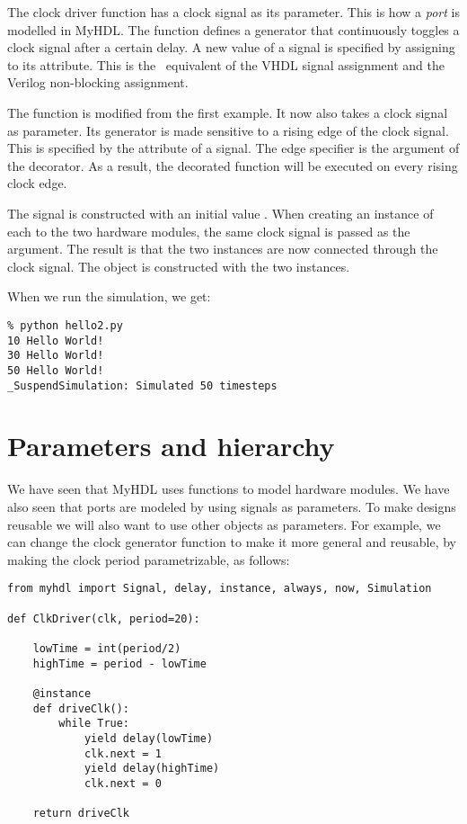 The clock driver function  has a
clock signal as its parameter. This is how a
\emph{port} is modelled in MyHDL. The function
defines a generator
that continuously toggles a clock signal after a certain delay.
A new value of a signal is specified by assigning to its
 attribute. This is the \myhdl\ equivalent of 
the VHDL signal assignment and the 
Verilog non-blocking assignment.

The  function is modified from the
first example. It now also takes a clock signal as parameter.
Its generator is made sensitive to a rising
edge of the clock signal. This is specified by the
 attribute of a signal. The edge
specifier is the argument of the 
decorator. As a result, the decorated function
will be executed on every rising clock edge.

The  signal is constructed with an initial value
. When creating an instance of each to the two
hardware modules, the same clock signal is passed as
the argument. The result is that the two instances
are now connected through the clock signal.
The  object is constructed with the
two instances.

When we run the simulation, we get:

\begin{verbatim}
% python hello2.py
10 Hello World!
30 Hello World!
50 Hello World!
_SuspendSimulation: Simulated 50 timesteps
\end{verbatim}


\section{Parameters and hierarchy \label{intro-hier}}

We have seen that MyHDL uses functions to model hardware
modules. We have also seen that ports are modeled by using
signals as parameters. To make designs reusable we will also
want to use other objects as parameters. For example, we can
change the clock generator function to make it more general
and reusable, by making the clock period parametrizable, as
follows:

\begin{verbatim}
from myhdl import Signal, delay, instance, always, now, Simulation

def ClkDriver(clk, period=20):
    
    lowTime = int(period/2)
    highTime = period - lowTime

    @instance
    def driveClk():
        while True:
            yield delay(lowTime)
            clk.next = 1
            yield delay(highTime)
            clk.next = 0

    return driveClk
\end{verbatim}

